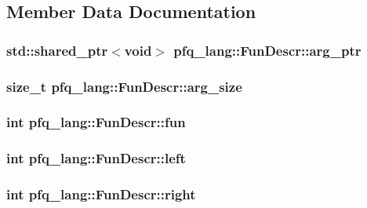 \subsection{Member Data Documentation}
\hypertarget{structpfq__lang_1_1FunDescr_aa96cb2764befea1e5b8b61927e4a4871}{
\subsubsection[{arg\-\_\-ptr}]{\setlength{\rightskip}{0pt plus 5cm}std\-::shared\-\_\-ptr$<$void$>$ pfq\-\_\-lang\-::\-Fun\-Descr\-::arg\-\_\-ptr}}\label{structpfq__lang_1_1FunDescr_aa96cb2764befea1e5b8b61927e4a4871}
\hypertarget{structpfq__lang_1_1FunDescr_a6690de6f15bab43587dadf2f88491ae4}{
\subsubsection[{arg\-\_\-size}]{\setlength{\rightskip}{0pt plus 5cm}size\-\_\-t pfq\-\_\-lang\-::\-Fun\-Descr\-::arg\-\_\-size}}\label{structpfq__lang_1_1FunDescr_a6690de6f15bab43587dadf2f88491ae4}
\hypertarget{structpfq__lang_1_1FunDescr_a073bf3b9daa315c7498dacd6d4c8266f}{
\subsubsection[{fun}]{\setlength{\rightskip}{0pt plus 5cm}int pfq\-\_\-lang\-::\-Fun\-Descr\-::fun}}\label{structpfq__lang_1_1FunDescr_a073bf3b9daa315c7498dacd6d4c8266f}
\hypertarget{structpfq__lang_1_1FunDescr_abdd618d54ab1e074a83d698d5a4b8197}{
\subsubsection[{left}]{\setlength{\rightskip}{0pt plus 5cm}int pfq\-\_\-lang\-::\-Fun\-Descr\-::left}}\label{structpfq__lang_1_1FunDescr_abdd618d54ab1e074a83d698d5a4b8197}
\hypertarget{structpfq__lang_1_1FunDescr_afaca33d533c4668acfd5e6aea52026b4}{
\subsubsection[{right}]{\setlength{\rightskip}{0pt plus 5cm}int pfq\-\_\-lang\-::\-Fun\-Descr\-::right}}\label{structpfq__lang_1_1FunDescr_afaca33d533c4668acfd5e6aea52026b4}
